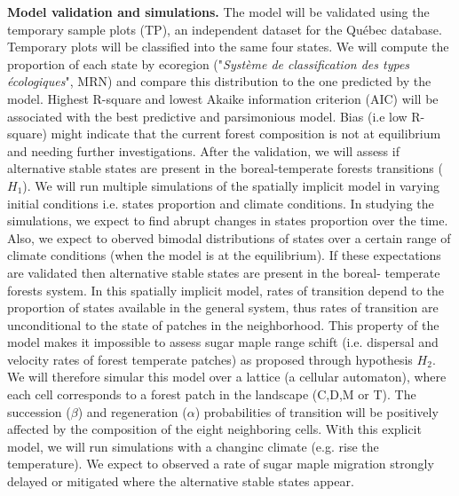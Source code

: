 \textbf{Model validation and simulations.}  The model will be validated using
the temporary sample plots (TP), an independent dataset for the
Québec database. Temporary plots will be classified into the same four states.
We will compute the proportion of each state by ecoregion ("\textit{Système de
classification des types écologiques}", MRN) and compare this distribution to the one
predicted by the model.  Highest R-square and lowest Akaike information
criterion (AIC) will be associated with the best predictive and parsimonious
model. 
Bias (i.e low R-square) might indicate that the current forest
composition is not at equilibrium and needing further investigations. After the
validation, we will assess if alternative stable states are present in the
boreal-temperate forests transitions ($H_1$). We will run multiple simulations
of the spatially implicit model in varying initial conditions i.e. states
proportion and climate conditions. In studying the simulations, we expect to
find abrupt changes in states proportion over the time. Also, we expect to
oberved bimodal distributions of states over a certain range of climate
conditions (when the model is at the equilibrium). If these expectations are
validated then alternative stable states are present in the boreal- temperate
forests system.  In this spatially implicit model, rates of transition depend to the
proportion of states available in the general system, thus rates of transition
are unconditional to the state of patches in the neighborhood. 
This property of
the model makes it impossible to assess sugar maple range schift (i.e. dispersal
and velocity rates of forest temperate patches) as proposed through hypothesis
$H_2$. We will therefore simular this model over a lattice (a cellular automaton), where each
cell corresponds to a forest patch in the landscape (C,D,M or T). The succession
($\beta$) and regeneration ($\alpha$) probabilities of transition will be positively
affected by the composition of the eight neighboring cells.  With this
explicit model, we will run simulations with a changinc climate
(e.g. rise the temperature). We expect to observed a rate of sugar maple
migration strongly delayed or mitigated where the alternative stable states
appear.

\clearpage

